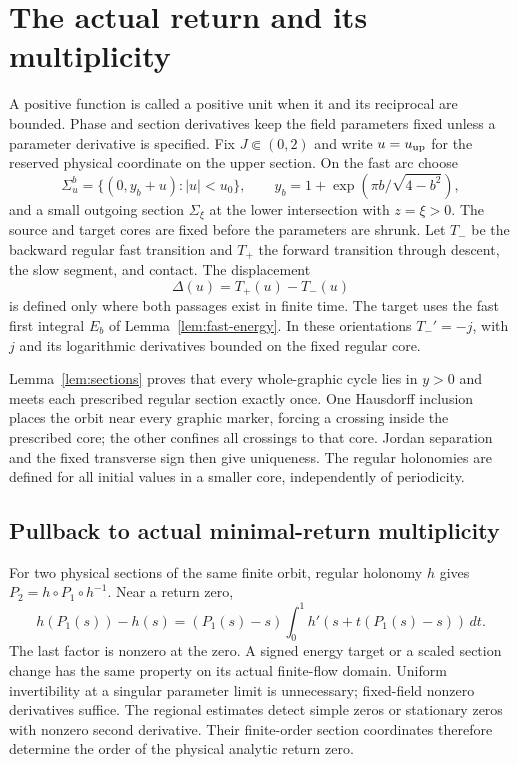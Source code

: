 \section{The actual return and its multiplicity}\label{sec:return-framework}
A positive function is called a positive unit when it and its reciprocal
are bounded. Phase and section derivatives keep the field parameters
fixed unless a parameter derivative is specified.
Fix $J\Subset(0,2)$ and write $u=u_{\rm up}$ for the reserved
physical coordinate on the upper section. On the fast arc choose
\[
 \Sigma_u^b=\{(0,y_b+u):|u|<u_0\},\qquad
 y_b=1+\exp(\pi b/\sqrt{4-b^2}),
\]
and a small outgoing section $\Sigma_\xi$ at the lower intersection
with $z=\xi>0$. The source and target cores are fixed before the
parameters are shrunk. Let $T_-$ be the backward regular fast transition
and $T_+$ the forward transition through descent, the slow segment,
and contact. The displacement
\begin{equation}\label{eq:common-displacement}
 \Delta(u)=T_+(u)-T_-(u)
\end{equation}
is defined only where both passages exist in finite time.
The target uses the fast first integral $E_b$ of
Lemma~\ref{lem:fast-energy}. In these orientations
$T_-'=-j$, with $j$ and its logarithmic derivatives bounded on the
fixed regular core.

Lemma~\ref{lem:sections} proves that every whole-graphic cycle lies in
$y>0$ and meets each prescribed regular section exactly once.
One Hausdorff inclusion places the orbit near every graphic marker,
forcing a crossing inside the prescribed core; the other confines all
crossings to that core. Jordan separation and the fixed transverse sign
then give uniqueness. The regular holonomies are defined for all initial
values in a smaller core, independently of periodicity.


\subsection{Pullback to actual minimal-return multiplicity}
For two physical sections of the same finite orbit, regular
holonomy $h$ gives $P_2=h\circ P_1\circ h^{-1}$.
Near a return zero,
\[
 h(P_1(s))-h(s)
 =(P_1(s)-s)\int_0^1h'(s+t(P_1(s)-s))\,dt .
\]
The last factor is nonzero at the zero.
A signed energy target or a scaled section change has the same
property on its actual finite-flow domain.
Uniform invertibility at a singular parameter limit is unnecessary;
fixed-field nonzero derivatives suffice.
The regional estimates detect simple zeros or stationary zeros with
nonzero second derivative. Their finite-order section coordinates
therefore determine the order of the physical analytic return zero.

